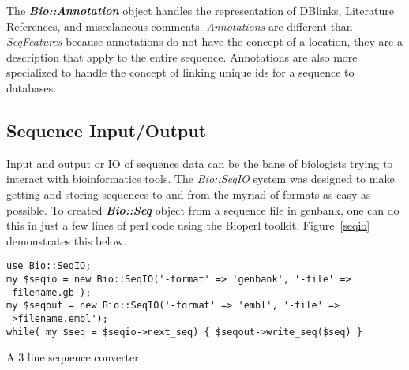 \documentclass{article}
\begin{document}
\par
The \emph{\bf Bio::Annotation} object handles the representation of
DBlinks, Literature References, and miscelaneous comments.
\emph{Annotations} are different than \emph{SeqFeatures} because
annotations do not have the concept of a location, they are a
description that apply to the entire sequence.  Annotations are also
more specialized to handle the concept of linking unique ids for a
sequence to databases.

\subsection{Sequence Input/Output}

Input and output or IO of sequence data can be the bane of biologists
trying to interact with bioinformatics tools.  The \emph{Bio::SeqIO}
system was designed to make getting and storing sequences to and from
the myriad of formats as easy as possible.  To created \emph{\bf
Bio::Seq} object from a sequence file in genbank, one can do this in
just a few lines of perl code using the Bioperl toolkit.
Figure~\ref{seqio} demonstrates this below.

\begin{table}
\begin{verbatim}
use Bio::SeqIO;
my $seqio = new Bio::SeqIO('-format' => 'genbank', '-file' => 'filename.gb');
my $seqout = new Bio::SeqIO('-format' => 'embl', '-file' => '>filename.embl');
while( my $seq = $seqio->next_seq) { $seqout->write_seq($seq) }
\end{verbatim}
\label{seqio}
\caption{A 3 line sequence converter}
\end{table}
\end{document}
